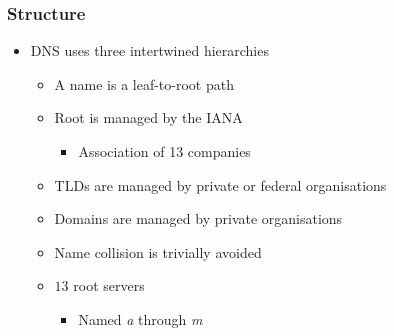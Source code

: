 \subsubsection{Structure}
\begin{itemize}
    \item DNS uses three intertwined hierarchies
        \begin{itemize}
                \begin{itemize}
                     After the TLD
                        \begin{itemize}
                            \item Imaginary dot
                        \end{itemize}
                     Sit at the top
                     Subtree of the TLD
                     Subtree of domain
                        \begin{itemize}
                            \item Can be arbitrarily nested
                        \end{itemize}
                    \item A name is a leaf-to-root path
                \end{itemize}
                \begin{itemize}
                    \item Root is managed by the IANA
                        \begin{itemize}
                            \item Association of 13 companies
                        \end{itemize}
                    \item TLDs are managed by private or federal organisations
                    \item Domains are managed by private organisations
                    \item Name collision is trivially avoided
                \end{itemize}
                \begin{itemize}
                    \item $13$ root servers
                        \begin{itemize}
                            \item Named \textit{a} through \textit{m}

\end{itemize}
\end{itemize}
\end{itemize}
\end{itemize}
